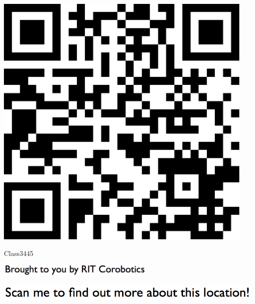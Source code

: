 \documentclass[letterpaper]{article}
\begin{document}
 \begingroup 
 \centerline{\includegraphics[scale=1,width=5in,height=5in]{Class3445.png}} 
 \endgroup 
 \vspace*{\fill} 

 \hfill{\small Class3445} 

  \vspace{0.7in} 
 
 \centerline{\includegraphics[scale=1,width=3in]{text-bottom.png}} 
 
 \pagebreak 
{} 
 \vspace*{\fill} 
 
  \centerline{\includegraphics[scale=1,width=6in]{text-top.png}} 
 
 \vspace{0.5in} 
 
\end{document}

